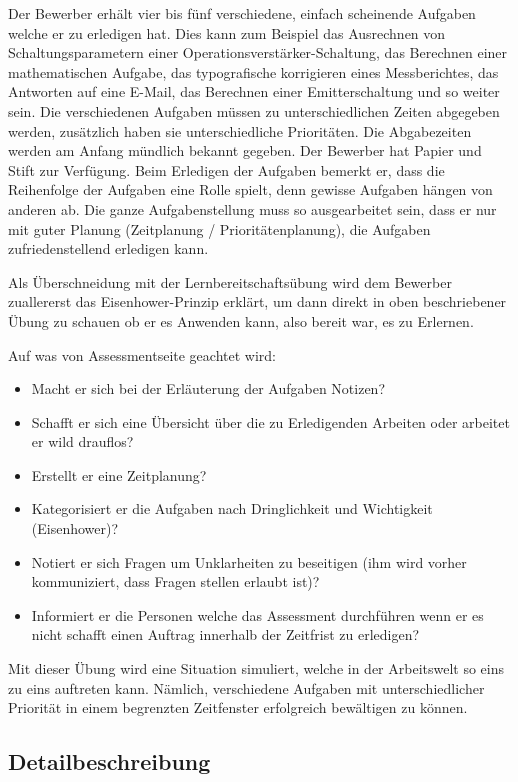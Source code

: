 Der Bewerber erhält vier bis fünf verschiedene, einfach scheinende Aufgaben welche er zu erledigen hat. Dies kann zum Beispiel das Ausrechnen von Schaltungsparametern einer Operationsverstärker-Schaltung, das Berechnen einer
mathematischen Aufgabe, das typografische korrigieren eines Messberichtes, das Antworten auf eine E-Mail, das Berechnen einer Emitterschaltung und so weiter sein. Die verschiedenen Aufgaben müssen zu unterschiedlichen Zeiten abgegeben werden, zusätzlich haben sie unterschiedliche Prioritäten. Die Abgabezeiten werden am Anfang mündlich bekannt gegeben. Der Bewerber hat Papier und Stift zur Verfügung.
Beim Erledigen der Aufgaben bemerkt er, dass die Reihenfolge der Aufgaben eine Rolle spielt, denn gewisse Aufgaben hängen von anderen ab. Die ganze Aufgabenstellung muss so ausgearbeitet sein, dass er nur mit
guter Planung (Zeitplanung / Prioritätenplanung), die Aufgaben zufriedenstellend erledigen kann.

Als Überschneidung mit der Lernbereitschaftsübung wird dem Bewerber zuallererst das Eisenhower-Prinzip erklärt, um dann direkt in oben beschriebener Übung zu schauen ob er es Anwenden kann, also bereit war, es zu Erlernen. 

Auf was von Assessmentseite geachtet wird:
\begin{itemize}
\item Macht er sich bei der Erläuterung der Aufgaben Notizen?
\item Schafft er sich eine Übersicht über die zu Erledigenden Arbeiten oder arbeitet er wild drauflos?
\item Erstellt er eine Zeitplanung?
\item Kategorisiert er die Aufgaben nach Dringlichkeit und Wichtigkeit (Eisenhower)?
\item Notiert er sich Fragen um Unklarheiten zu beseitigen (ihm wird vorher kommuniziert, dass Fragen stellen erlaubt ist)?
\item Informiert er die Personen welche das Assessment durchführen wenn er es nicht schafft einen Auftrag innerhalb der Zeitfrist zu erledigen?
\end{itemize}

Mit dieser Übung wird eine Situation simuliert, welche in der Arbeitswelt so eins zu eins auftreten kann. Nämlich, verschiedene Aufgaben mit unterschiedlicher Priorität in einem begrenzten Zeitfenster erfolgreich bewältigen zu können.

\subsection{Detailbeschreibung}


